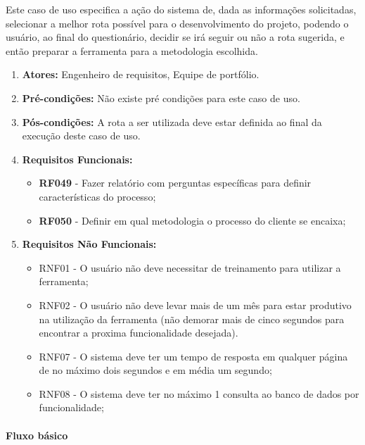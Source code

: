 Este caso de uso especifica a ação do sistema de, dada as informações solicitadas, selecionar a melhor rota possível para o desenvolvimento do projeto, podendo o usuário, ao final do questionário, decidir se irá seguir ou não a rota sugerida, e então preparar a ferramenta para a metodologia escolhida.

\begin{enumerate}
	\item \textbf{Atores:}
		Engenheiro de requisitos, Equipe de portfólio. 
	\item \textbf{Pré-condições:}
		Não existe pré condições para este caso de uso.
	\item \textbf{Pós-condições:}
		A rota a ser utilizada deve estar definida ao final da execução deste caso de uso.
	\item \textbf{Requisitos Funcionais:}
		\begin{itemize}
			\item \textbf{RF049} - Fazer relatório com perguntas específicas para definir características do processo;
			\item \textbf{RF050} - Definir em qual metodologia o processo do cliente se encaixa;
		\end{itemize}
	\item \textbf{Requisitos Não Funcionais:}
		\begin{itemize}
			\item RNF01 - O usuário não deve necessitar de treinamento para utilizar a ferramenta;
			\item RNF02 - O usuário não deve levar mais de um mês para estar produtivo na utilização da ferramenta (não demorar mais de cinco segundos para encontrar a proxima funcionalidade desejada).
			\item RNF07 - O sistema deve ter um tempo de resposta em qualquer página de no máximo dois segundos e em média um segundo;
			\item RNF08 - O sistema deve ter no máximo 1 consulta ao banco de dados por funcionalidade;
		\end{itemize}
\end{enumerate}

\paragraph{Fluxo básico}

